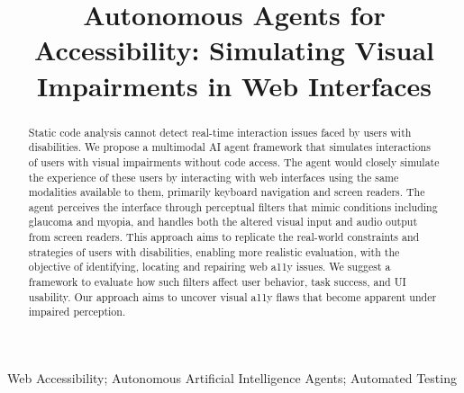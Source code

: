 \documentclass[10pt, conference]{IEEEtran}
\begin{document}
\title{Autonomous Agents for Accessibility: Simulating Visual Impairments in Web Interfaces}

\author{
}

\maketitle

\begin{abstract}
Static code analysis cannot detect real-time interaction issues faced by users with disabilities. We propose a multimodal \ac{AI} agent framework that simulates interactions of users with visual impairments without code access. 
The agent would closely simulate the experience of these users by interacting with web interfaces using the same modalities available to them, primarily keyboard navigation and screen readers. The agent perceives the interface through perceptual filters that mimic conditions including glaucoma and myopia, and handles both the altered visual input and audio output from screen readers. 
This approach aims to replicate the real-world constraints and strategies of users with disabilities, enabling more realistic evaluation, with the objective of identifying, locating and repairing web \ac{a11y} issues. 
We suggest a framework to evaluate how such filters affect user behavior, task success, and \ac{UI} usability. Our approach aims to uncover visual \ac{a11y} flaws that become apparent under impaired perception. 
\end{abstract}

\begin{IEEEkeywords}
Web Accessibility; Autonomous Artificial Intelligence Agents; Automated Testing
\end{IEEEkeywords}









\balance


\end{document}
